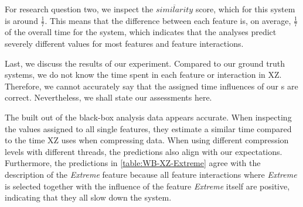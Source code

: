 For research question two, we inspect the $\overline{similarity}$ score, which for this system is around $\frac{1}{7}$.
This means that the difference between each feature is, on average, $\frac{1}{7}$ of the overall time for the system,
which indicates that the analyses predict severely different values for most features and feature interactions.

Last, we discuss the results of our experiment. Compared to our ground truth systems, 
we do not know the time spent in each feature or interaction in \textsc{XZ}. 
Therefore, we cannot accurately say that the assigned time influences of our {\perfInfluenceModel}s are correct. 
Nevertheless, we shall state our assessments here.

The {\perfInfluenceModel} built out of the black-box analysis data appears accurate. 
When inspecting the values assigned to all single features, they estimate a similar time compared to the time \textsc{XZ} uses when compressing data. 
When using different compression levels with different threads, the predictions also align with our expectations.
Furthermore, the predictions in \autoref{table:WB-XZ-Extreme} agree with the description of the \emph{Extreme} feature because
all feature interactions where \emph{Extreme} is selected together with the influence of the feature \emph{Extreme} itself are positive,
indicating that they all slow down the system. 

